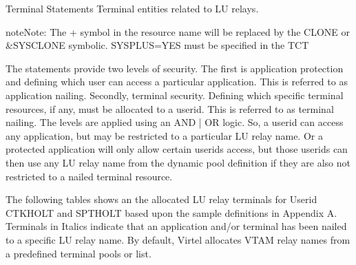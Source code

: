 \documentclass[letterpaper,10pt,english]{sphinxmanual}
\begin{document}
\sphinxAtStartPar
Terminal  Statements \textendash{} Terminal entities related to LU relays.

\begin{sphinxVerbatim}[commandchars=\\\{\}]
       
\end{sphinxVerbatim}

\begin{sphinxadmonition}{note}{Note:}
\sphinxAtStartPar
The + symbol in the resource name will be replaced by the CLONE or \&SYSCLONE symbolic. SYSPLUS=YES must be specified in the TCT
\end{sphinxadmonition}

\sphinxAtStartPar
The statements provide two levels of security. The first is application protection and defining which user can access a particular application. This is referred to as application nailing. Secondly, terminal security. Defining which specific terminal resources, if any, must be allocated to a userid. This is referred to as terminal nailing. The levels are applied using an AND | OR logic. So, a userid can access any application, but may be restricted to a particular LU relay name. Or a protected application will only allow certain userids access, but those userids can then use any LU relay name from the dynamic pool definition if they are also not restricted to a nailed terminal resource.

\sphinxAtStartPar
The following tables shows an the allocated LU relay terminals for Userid CTKHOLT and SPTHOLT based upon the sample definitions in Appendix A. Terminals in Italics indicate that an application and/or terminal has been nailed to a specific LU relay name. By default, Virtel allocates VTAM relay names from a predefined terminal pools or list.
\end{document}
